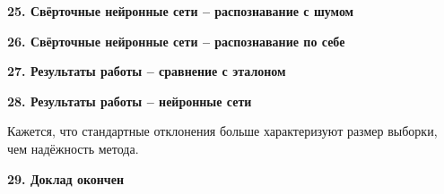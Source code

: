 \documentclass[a4paper, 12pt]{article}
\begin{document}
\begin{center}
	\textbf{\large 25. Свёрточные нейронные сети – распознавание с шумом}
\end{center}	



\begin{center}
	\textbf{\large 26. Свёрточные нейронные сети – распознавание по себе}
\end{center}	



\begin{center}
	\textbf{\large 27. Результаты работы – сравнение с эталоном}
\end{center}	



\begin{center}
	\textbf{\large 28. Результаты работы – нейронные сети}
\end{center}	

Кажется, что стандартные отклонения больше характеризуют размер выборки, чем надёжность метода.



\begin{center}
	\textbf{\large 29. Доклад окончен}
\end{center}	


	
\end{document}

